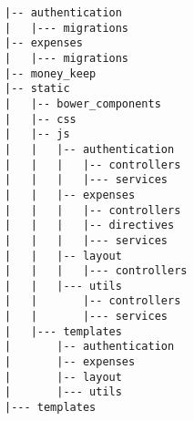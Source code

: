 \begin{lstlisting}[title=Structura de directoare a aplicației]
|-- authentication
|   |--- migrations
|-- expenses
|   |--- migrations
|-- money_keep
|-- static
|   |-- bower_components
|   |-- css
|   |-- js
|   |   |-- authentication
|   |   |   |-- controllers
|   |   |   |--- services
|   |   |-- expenses
|   |   |   |-- controllers
|   |   |   |-- directives
|   |   |   |--- services
|   |   |-- layout
|   |   |   |--- controllers
|   |   |--- utils
|   |       |-- controllers
|   |       |--- services
|   |--- templates
|       |-- authentication
|       |-- expenses
|       |-- layout
|       |--- utils
|--- templates
\end{lstlisting}
